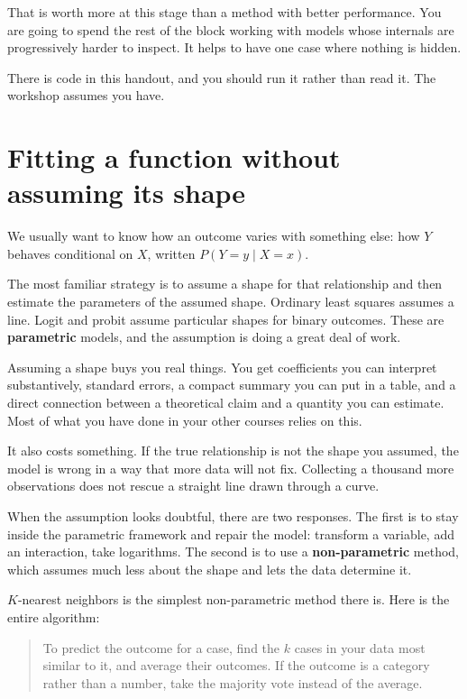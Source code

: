 \documentclass[
  a4paper,
]{scrbook}
\begin{document}
That is worth more at this stage than a method with better performance.
You are going to spend the rest of the block working with models whose
internals are progressively harder to inspect. It helps to have one case
where nothing is hidden.

There is code in this handout, and you should run it rather than read
it. The workshop assumes you have.

\chapter{Fitting a function without assuming its
shape}\label{fitting-a-function-without-assuming-its-shape}

We usually want to know how an outcome varies with something else: how
\(Y\) behaves conditional on \(X\), written \(P(Y=y \mid X=x)\).

The most familiar strategy is to assume a shape for that relationship
and then estimate the parameters of the assumed shape. Ordinary least
squares assumes a line. Logit and probit assume particular shapes for
binary outcomes. These are \textbf{parametric} models, and the
assumption is doing a great deal of work.

Assuming a shape buys you real things. You get coefficients you can
interpret substantively, standard errors, a compact summary you can put
in a table, and a direct connection between a theoretical claim and a
quantity you can estimate. Most of what you have done in your other
courses relies on this.

It also costs something. If the true relationship is not the shape you
assumed, the model is wrong in a way that more data will not fix.
Collecting a thousand more observations does not rescue a straight line
drawn through a curve.

When the assumption looks doubtful, there are two responses. The first
is to stay inside the parametric framework and repair the model:
transform a variable, add an interaction, take logarithms. The second is
to use a \textbf{non-parametric} method, which assumes much less about
the shape and lets the data determine it.

\(K\)-nearest neighbors is the simplest non-parametric method there is.
Here is the entire algorithm:

\begin{quote}
To predict the outcome for a case, find the \(k\) cases in your data
most similar to it, and average their outcomes. If the outcome is a
category rather than a number, take the majority vote instead of the
average.
\end{quote}
\end{document}
